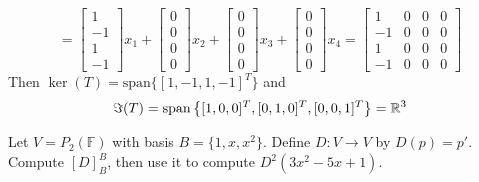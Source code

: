 \documentclass[11pt]{article}
\begin{document}
\begin{sol}
\[        = \begin{bmatrix}
            1\\-1\\1\\-1
        \end{bmatrix}x_1 
        + \begin{bmatrix}
            0\\0\\0\\0
        \end{bmatrix}x_2
         + \begin{bmatrix}
            0\\0\\0\\0
        \end{bmatrix}x_3
         + \begin{bmatrix}
            0\\0\\0\\0
        \end{bmatrix}x_4
        = \begin{bmatrix}
            1 & 0 & 0 & 0\\
            -1 &0&0&0\\
            1&0&0&0\\
            -1&0&0&0
        \end{bmatrix}
    \]
    Then $\ker(T) = \mathrm{span}\{[1,-1,1,-1]^T\}$ and 
    \[
        \Im(T) = \mathrm{span}\left\{[1,0,0]^T,[0,1,0]^T,[0,0,1]^T\right\} = \mathbb{R}^3
    \]
\end{sol}
\begin{problem}
Let $V=P_2(\mathbb{F})$ with basis $B=\{1,x,x^2\}$. Define $D:V\to V$ by $D(p)=p'$. 
Compute $[D]_B^B$, then use it to compute $D^2(3x^2-5x+1)$.
\end{problem}
\end{document}
